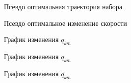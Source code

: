 \begin{figure}[H]
\centering
\scalebox{0.8}{}
\caption{Псевдо оптимальная траектория набора}
\label{fig:fig2}
\end{figure}
\begin{figure}[H]
\centering
\scalebox{0.8}{}
\caption{Псевдо оптимальное изменение скорости}
\label{fig:fig4}
\end{figure}

\begin{table}[H]
\centering
\resizebox{\textwidth-5cm}{!}{
    
}
\caption{$q_{km}\, [\frac{кг}{км}], V \, [\frac{м}{с}] $}
\label{t:1}

\end{table}



\begin{figure}[H]
\centering
\scalebox{0.8}{}
\caption{График изменения $q_{km}$}
\label{fig:q_km_1}
\end{figure}
\begin{figure}[H]
\centering
\scalebox{0.8}{}
\caption{График изменения $q_{km}$}
\label{fig:q_km_2}
\end{figure}
\begin{figure}[H]
\centering
\scalebox{0.8}{}
\caption{График изменения $q_{km}$}
\label{fig:q_km_3}
\end{figure}
